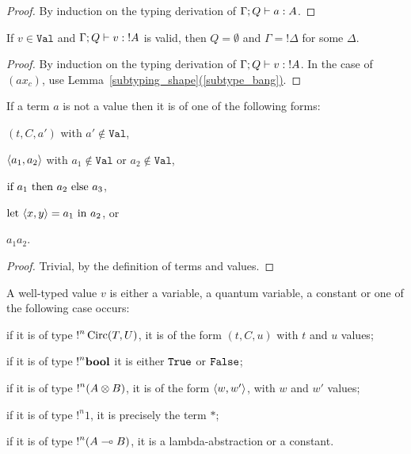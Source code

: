 \documentclass[twoside]{article}
\begin{document}
\begin{proof}
By induction on the typing derivation of $\Gamma;Q \vdash a:A$.
\end{proof}

\begin{lemma}
\label{context_value}
If $v\in\mathtt{Val}$ and $\Gamma;Q \vdash v:{!}A$ is valid, 
then $Q=\emptyset$ and $\Gamma={!}\Delta$ for some $\Delta$.
\end{lemma}

\begin{proof}
By induction on the typing derivation of $\Gamma;Q \vdash v:{!}A$. 
In the case of $(ax_c)$, use Lemma~\hyperref[subtype_bang]{\ref*{subtyping_shape}(\ref*{subtype_bang})}.
\end{proof}

\begin{lemma}
\label{non_values}
If a term $a$ is not a value then it is of one 
of the following forms: 
\begin{compactitemize}
\item $(t,C,a')$ with $a'\notin \mathtt{Val}$, 
\item $\langle a_1,a_2\rangle$ with $a_1\notin \mathtt{Val}$ or $a_2\notin
  \mathtt{Val}$, 
\item $\textrm{\rm if}~ a_1 ~\textrm{\rm then}~ a_2 ~\textrm{\rm else}~ a_3$,
\item $\textrm{\rm let}~ \langle x,y\rangle = a_1 ~\textrm{\rm in}~ a_2$, or
\item $a_1a_2$.
\end{compactitemize}
\end{lemma}

\begin{proof}
Trivial, by the definition of terms and values.
\end{proof}

\begin{lemma}
\label{form_values}
A well-typed value $v$ is either a variable, a quantum variable, a constant or one 
of the following case occurs: 
\begin{compactitemize}
\item if it is of type ${!}^n\mathop{\textrm{Circ}}\nolimits(T,U)$, it is of the 
form $(t,C,u)$ with $t$ and $u$ values; 
\item if it is of type ${!}^n\textrm{\bf bool}$ it is either 
$\texttt{True}$ or $\texttt{False}$; 
\item if it is of type ${!}^n (A\otimes B)$, it is of the
form $\langle w,w'\rangle$, with $w$ and $w'$ values; 
\item if it is of type ${!}^n1$, it is 
precisely the term $*$; 
\item if it is of type ${!}^n (A\multimap B)$, it is a 
lambda-abstraction or a constant.
\end{compactitemize}
\end{lemma}
\end{document}
